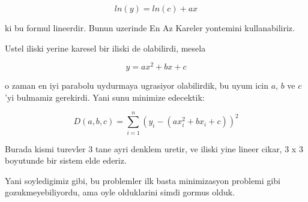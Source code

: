 \documentclass[12pt,fleqn]{article}
\begin{document}
\[ ln(y) = ln(c) + ax \]

ki bu formul lineerdir. Bunun uzerinde En Az Kareler yontemini
kullanabiliriz. 

Ustel iliski yerine karesel bir iliski de olabilirdi, mesela

\[ y = ax^2 + bx + c \]

o zaman en iyi parabolu uydurmaya ugrasiyor olabilirdik, bu uyum icin $a$,
$b$ ve $c$'yi bulmamiz gerekirdi. Yani sunu minimize edecektik:

\[ D(a,b,c) = \sum_{i=1}^n (y_i - ( ax_i^2 + bx_i + c ))^2  \]

Burada kismi turevler 3 tane ayri denklem uretir, ve iliski yine lineer
cikar, 3 x 3 boyutunde bir sistem elde ederiz. 

Yani soyledigimiz gibi, bu problemler ilk basta minimizasyon problemi gibi
gozukmeyebiliyordu, ama oyle olduklarini simdi gormus olduk. 
\end{document}

